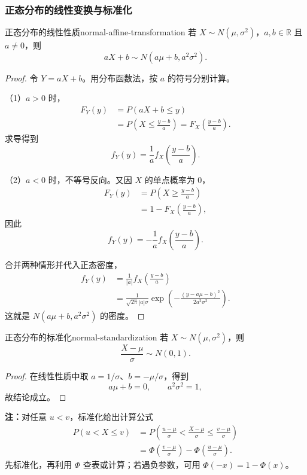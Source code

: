 \subsubsection*{正态分布的线性变换与标准化}

\begin{mytheorem}{正态分布的线性性质}{normal-affine-transformation}
若 $X\sim N(\mu,\sigma^2)$，$a,b\in\mathbb R$ 且 $a\ne0$，则
\[
aX+b\sim N(a\mu+b,a^2\sigma^2).
\]
\end{mytheorem}

\begin{proof}
令 $Y=aX+b$。用分布函数法，按 $a$ 的符号分别计算。

（1）$a>0$ 时，
\[
\begin{aligned}
F_Y(y)
&=P(aX+b\leq y)\\
&=P\left(X\leq\frac{y-b}{a}\right)
=F_X\left(\frac{y-b}{a}\right).
\end{aligned}
\]
求导得到
\[
f_Y(y)=\frac1a f_X\left(\frac{y-b}{a}\right).
\]

（2）$a<0$ 时，不等号反向。又因 $X$ 的单点概率为 $0$，
\[
\begin{aligned}
F_Y(y)
&=P\left(X\geq\frac{y-b}{a}\right)\\
&=1-F_X\left(\frac{y-b}{a}\right),
\end{aligned}
\]
因此
\[
f_Y(y)=-\frac1a f_X\left(\frac{y-b}{a}\right).
\]

合并两种情形并代入正态密度，
\[
\begin{aligned}
f_Y(y)
&=\frac1{|a|}f_X\left(\frac{y-b}{a}\right)\\
&=\frac1{\sqrt{2\pi}|a|\sigma}
\exp\left(-\frac{(y-a\mu-b)^2}{2a^2\sigma^2}\right).
\end{aligned}
\]
这就是 $N(a\mu+b,a^2\sigma^2)$ 的密度。
\end{proof}

\begin{mycorollary}{正态分布的标准化}{normal-standardization}
若 $X\sim N(\mu,\sigma^2)$，则
\[
\frac{X-\mu}{\sigma}\sim N(0,1).
\]
\end{mycorollary}

\begin{proof}
在线性性质中取 $a=1/\sigma$、$b=-\mu/\sigma$，得到
\[
a\mu+b=0,\qquad a^2\sigma^2=1,
\]
故结论成立。
\end{proof}

\textbf{注：}\quad 对任意 $u<v$，标准化给出计算公式
\[
\begin{aligned}
P(u<X\leq v)
&=P\left(\frac{u-\mu}{\sigma}
<\frac{X-\mu}{\sigma}\leq\frac{v-\mu}{\sigma}\right)\\
&=\Phi\left(\frac{v-\mu}{\sigma}\right)
-\Phi\left(\frac{u-\mu}{\sigma}\right).
\end{aligned}
\]
先标准化，再利用 $\Phi$ 查表或计算；若遇负参数，可用 $\Phi(-x)=1-\Phi(x)$。

